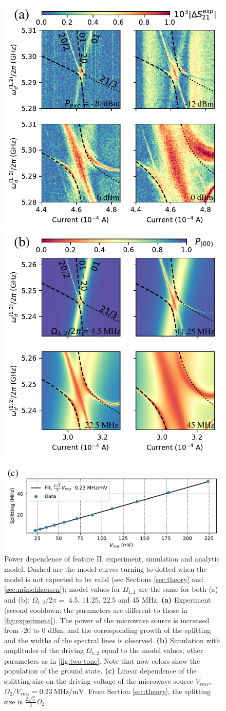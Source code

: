 \documentclass[%
 aps, prx,
 amsmath,amssymb,
 reprint,%
superscriptaddress
]{revtex4-2}
\begin{document}
\begin{figure}
	\includegraphics[width=.49\linewidth]{powerscan}
	\includegraphics[width=.49\linewidth]{zoom2_picture}
	
	\includegraphics[width=.7\linewidth]{powerscan_1d}
	\caption{Power dependence of feature II: 
	experiment, simulation and analytic model. Dashed are the model curves turning to dotted when the 
	model is not expected to be valid (see 
	Sections \ref{sec:theory} and 
	\ref{sec:münchhausen}); model values for 
	$\Omega_{1,2}$ are the same for both (a) and 
	(b): $\Omega_{1,2}/2\pi=$ 4.5, 11.25, 22.5 
	and 45 MHz. \textbf{(a)} Experiment (second 
	cooldown; the parameters are different to 
	those in \autoref{fig:experiment}). The power 
	of the microwave source is increased from -20 
	to 0 dBm, and the corresponding growth of the 
	splitting and the widths of the spectral 
	lines is observed. \textbf{(b)} Simulation 
	with amplitudes of the driving $\Omega_{1,2}$ 
	equal to the model values; other parameters 
	as in \autoref{fig:two-tone}. Note that now 
	colors show the population of the ground 
	state. \textbf{(c)} Linear dependence of the 
	splitting size on the driving voltage of the 
	microwave source $V_{rms}$, ${\Omega_2}/{V_{rms}} = 0.23\ 
	{\text{MHz}}/{\text{mV}}$. From Section 
	\ref{sec:theory}, the splitting size is 
	$\frac{2\sqrt{3}}{3} \Omega_2$.}
	\label{fig:zoom}
\end{figure}
\end{document}
